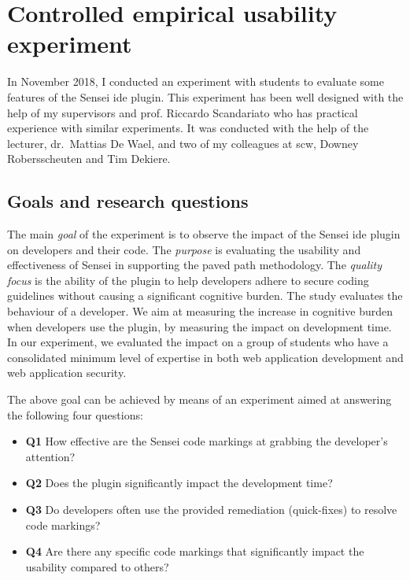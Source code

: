 \section{Controlled empirical usability experiment}
\label{sec:experiment}

In November 2018, I conducted an experiment with students to evaluate some features of the Sensei \gls{ide} plugin.
This experiment has been well designed with the help of my supervisors and prof. Riccardo Scandariato who has practical experience with similar experiments.
It was conducted with the help of the lecturer, dr.\ Mattias De Wael, and two of my colleagues at \gls{scw}, Downey Robersscheuten and Tim Dekiere.

\subsection{Goals and research questions}
The main \textit{goal} of the experiment is to observe the impact of the Sensei \gls{ide} plugin on developers and their code.
The \textit{purpose} is evaluating the usability and effectiveness of Sensei in supporting the paved path methodology.
The \textit{quality focus} is the ability of the plugin to help developers adhere to secure coding guidelines without causing a significant cognitive burden.
The study evaluates the behaviour of a developer.
We aim at measuring the increase in cognitive burden when developers use the plugin, by measuring the impact on development time.
In our experiment, we evaluated the impact on a group of students who have a consolidated minimum level of expertise in both web application development and web application security.

The above goal can be achieved by means of an experiment aimed at answering the following four questions:
\begin{itemize}
    \item \textbf{Q1} How effective are the Sensei code markings at grabbing the developer's attention?
    \item \textbf{Q2} Does the plugin significantly impact the development time?
    \item \textbf{Q3} Do developers often use the provided remediation (quick-fixes) to resolve code markings?
    \item \textbf{Q4} Are there any specific code markings that significantly impact the usability compared to others?
\end{itemize}

